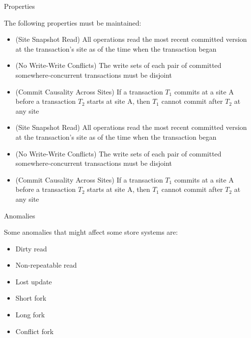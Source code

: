 \documentclass{beamer}
\begin{document}
		\begin{frame}{Properties}
		
		The following properties must be maintained:		
		\begin{itemize}
		\item (Site Snapshot Read) All operations read the most recent committed version at the transaction's site as of the time when the transaction began
		\item (No Write-Write Conflicts) The write sets of each pair of committed somewhere-concurrent transactions must be disjoint
		\item (Commit Causality Across Sites) If a transaction $T_{1}$ commits at a site A before a transaction $T_{2}$ starts at site A, then $T_{1}$ cannot commit after $T_{2}$ at any site
		\end{itemize}		
		
		\begin{itemize}
		\item (Site Snapshot Read) All operations read the most recent committed version at the transaction's site as of the time when the transaction began
		\item (No Write-Write Conflicts) The write sets of each pair of committed somewhere-concurrent transactions must be disjoint
		\item (Commit Causality Across Sites) If a transaction $T_{1}$ commits at a site A before a transaction $T_{2}$ starts at site A, then $T_{1}$ cannot commit after $T_{2}$ at any site
		\end{itemize}
		
		\end{frame}	

		\begin{frame}{Anomalies}
		
		Some anomalies that might affect some store systems are:
		\begin{itemize}
		\item Dirty read
		\item Non-repeatable read
		\item Lost update
		\item Short fork
		\item Long fork
		\item Conflict fork
		\end{itemize}		
		
		\end{frame}
\end{document}
